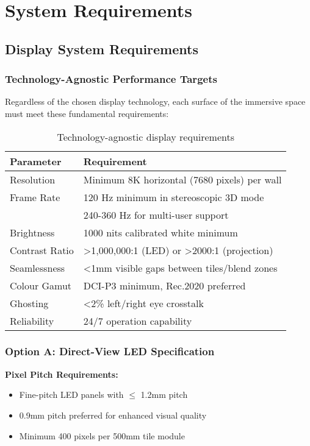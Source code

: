 \section{System Requirements}

\subsection{Display System Requirements}

\subsubsection{Technology-Agnostic Performance Targets}

Regardless of the chosen display technology, each surface of the immersive space must meet these fundamental requirements:

\begin{table}[h]
\centering
\begin{tabular}{|l|p{8cm}|}
\hline
\textbf{Parameter} & \textbf{Requirement} \\
\hline
Resolution & Minimum 8K horizontal (7680 pixels) per wall \\
\hline
Frame Rate & 120 Hz minimum in stereoscopic 3D mode \\
 & 240-360 Hz for multi-user support \\
\hline
Brightness & 1000 nits calibrated white minimum \\
\hline
Contrast Ratio & >1,000,000:1 (LED) or >2000:1 (projection) \\
\hline
Seamlessness & <1mm visible gaps between tiles/blend zones \\
\hline
Colour Gamut & DCI-P3 minimum, Rec.2020 preferred \\
\hline
Ghosting & <2\% left/right eye crosstalk \\
\hline
Reliability & 24/7 operation capability \\
\hline
\end{tabular}
\caption{Technology-agnostic display requirements}
\end{table}

\subsubsection{Option A: Direct-View LED Specification}

\textbf{Pixel Pitch Requirements:}
\begin{itemize}
    \item Fine-pitch LED panels with $\leq$ 1.2mm pitch
    \item 0.9mm pitch preferred for enhanced visual quality
    \item Minimum 400 pixels per 500mm tile module
\end{itemize}

